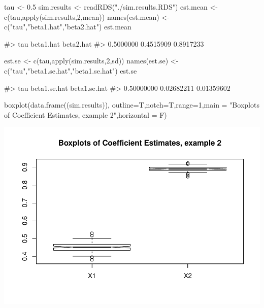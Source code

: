 \begin{Schunk}
\begin{Sinput}
tau <- 0.5
sim.results <- readRDS("./sim.results.RDS")
est.mean <- c(tau,apply(sim.results,2,mean))
names(est.mean) <- c("tau","beta1.hat","beta2.hat")
est.mean
\end{Sinput}
\begin{Soutput}
#>       tau beta1.hat beta2.hat 
#> 0.5000000 0.4515909 0.8917233
\end{Soutput}
\end{Schunk}

\begin{Schunk}
\begin{Sinput}
est.se <- c(tau,apply(sim.results,2,sd))
names(est.se) <- c("tau","beta1.se.hat","beta1.se.hat")
est.se
\end{Sinput}
\begin{Soutput}
#>          tau beta1.se.hat beta1.se.hat 
#>   0.50000000   0.02682211   0.01359602
\end{Soutput}
\end{Schunk}

\begin{Schunk}
\begin{Sinput}
boxplot(data.frame((sim.results)), outline=T,notch=T,range=1,main = "Boxplots of Coefficient Estimates, example 2",horizontal = F)
\end{Sinput}

\includegraphics{siqr_files/figure-latex/unnamed-chunk-14-1} \end{Schunk}

